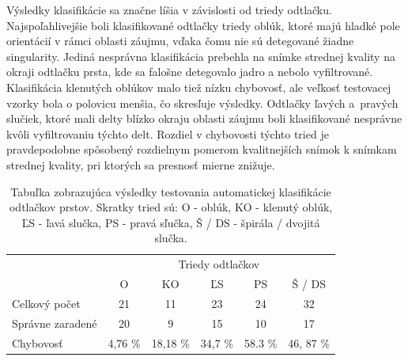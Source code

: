   Výsledky klasifikácie sa značne líšia v závislosti od triedy odtlačku. Najspoľahlivejšie boli klasifikované odtlačky triedy oblúk, ktoré majú hladké
  pole orientácií v rámci oblasti záujmu, vďaka čomu nie sú detegované žiadne singularity. Jediná nesprávna klasifikácia prebehla na snímke strednej kvality
  na okraji odtlačku prsta, kde sa falošne detegovalo jadro a nebolo vyfiltrované. Klasifikácia klenutých oblúkov malo tiež nízku chybovosť, ale veľkosť
  testovacej vzorky bola o polovicu menšia, čo skresľuje výsledky.
  Odtlačky ľavých a~pravých slučiek, ktoré mali delty blízko okraju oblasti záujmu boli klasifikované nesprávne kvôli vyfiltrovaniu týchto delt. Rozdiel v
  chybovosti týchto tried je pravdepodobne spôsobený rozdielnym pomerom kvalitnejších snímok k snímkam strednej kvality, pri ktorých sa presnosť mierne
  znižuje.

  \begin{table}[ht]
    \centering
    \caption{Tabuľka zobrazujúca výsledky testovania automatickej klasifikácie odtlačkov prstov. Skratky tried sú: O - oblúk, KO - klenutý oblúk,
    ĽS - ľavá slučka, PS - pravá sľučka, Š / DS - špirála / dvojitá slučka.}
    \begin{tabular}{ l | c | c | c | c | c | }
      \cline{2-6}
                                              & \multicolumn{5}{|c|}{Triedy odtlačkov}            \\
      \cline{2-6}
                                              & O       & KO        & ĽS     & PS    & Š / DS     \\
      \hline
      \multicolumn{1}{|l|}{Celkový počet}     & 21      & 11        & 23      & 24    & 32        \\
      \multicolumn{1}{|l|}{Správne zaradené}  & 20      & 9         & 15      & 10    & 17        \\
      \multicolumn{1}{|l|}{Chybovosť}         & 4,76 \% & 18,18 \%  & 34,7 \% & 58.3 \% & 46, 87 \% \\
      \hline
    \end{tabular}
    \label{tab:vysledky_testov}
  \end{table}

